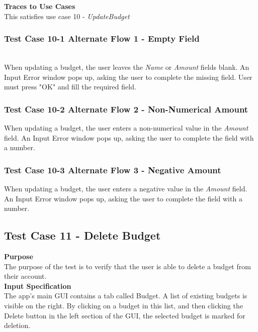 \documentclass[12pt]{article}
\begin{document}
\noindent
{\bf Traces to Use Cases}\\
This satisfies use case 10 - \textit{UpdateBudget}\\

\subsubsection
{Test Case 10-1 Alternate Flow 1 - Empty Field}\\
When updating a budget, the user leaves the \textit{Name} or \textit{Amount} fields blank.
An Input Error window pops up, asking the user to complete the missing field. User must press "OK" and fill the required field.

\subsubsection
{Test Case 10-2 Alternate Flow 2 - Non-Numerical Amount}
When updating a budget, the user enters a non-numerical value in the \textit{Amount} field.
An Input Error window pops up, asking the user to complete the field with a number. 

\subsubsection
{Test Case 10-3 Alternate Flow 3 - Negative Amount}
When updating a budget, the user enters a negative value in the \textit{Amount} field. 
An Input Error window pops up, asking the user to complete the field with a number. 

\clearpage

\subsection{Test Case 11 - Delete Budget} \label{TC-11}
\noindent
{\bf Purpose}\\
The purpose of the test is to verify that the user is able to delete a budget from their account. \\          
                         
\noindent
{\bf Input Specification}\\
The app's main GUI contains a tab called Budget. A list of existing budgets is visible on the right. By clicking on a budget in this list, and then clicking the Delete button in the left section of the GUI, the selected budget is marked for deletion.\\
\end{document}
